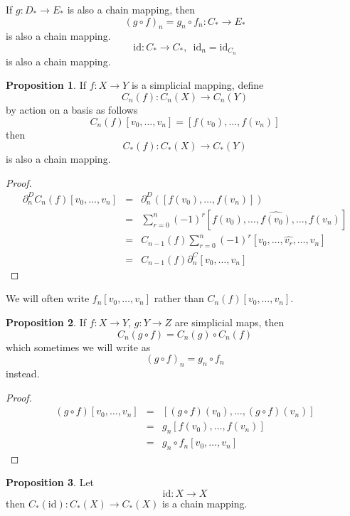 \documentclass[a4paper,14pt]{extarticle}
\theoremstyle{definition}
\newtheorem*{proposition}{Proposition}
\begin{document}
\noindent If $g:D_*\rightarrow E_*$ is also a chain mapping, then \[(g\circ f)_n=g_n\circ f_n:C_*\rightarrow E_*\] is also a chain mapping. \[\text{id}:C_*\rightarrow C_*,
\,\,\,\text{id}_n=\text{id}_{C_n}\] is also a chain mapping. \\

\begin{proposition}
If $f:X\rightarrow Y$ is a simplicial mapping, define \[C_n(f):C_n(X)\rightarrow C_n(Y)\] by action on a basis as follows
\[C_n(f)[v_0,\ldots,v_n]=[f(v_0),\ldots,f(v_n)]\] then \[C_*(f):C_*(X)\rightarrow C_*(Y)\] is also a chain mapping.
\end{proposition}

\begin{proof}
\begin{eqnarray*}
	\partial_n^DC_n(f)[v_0,\ldots,v_n]&=&\partial_n^D([f(v_0),\ldots,f(v_n)]) \\
		&=&\sum_{r=0}^n (-1)^r[f(v_0),\ldots,\hat{f(v_0)},\ldots,f(v_n)] \\
		&=&C_{n-1}(f)\sum_{r=0}^n (-1)^r[v_0,\ldots,\hat{v_r},\ldots,v_n] \\
		&=&C_{n-1}(f)\partial_n^C[v_0,\ldots,v_n]
\end{eqnarray*}
\end{proof}

We will often write $f_n[v_0,\ldots,v_n]$ rather than $C_n(f)[v_0,\ldots,v_n]$. \\

\begin{proposition}
If $f:X\rightarrow Y,\,g:Y\rightarrow Z$ are simplicial maps, then
\[C_n(g\circ f)=C_n(g)\circ C_n(f)\]
which sometimes we will write as \[(g\circ f)_n=g_n\circ f_n\] instead.
\end{proposition}

\begin{proof}
\begin{eqnarray*}
	(g\circ f)[v_0,\ldots,v_n]&=&[(g\circ f)(v_0),\ldots,(g\circ f)(v_n)] \\
				&=&g_n[f(v_0),\ldots,f(v_n)] \\
				&=&g_n\circ f_n[v_0,\ldots,v_n]
\end{eqnarray*}
\end{proof}

\begin{proposition}
Let \[\text{id}:X\rightarrow X\] then $C_*(\text{id}):C_*(X)\rightarrow C_*(X)$ is a chain mapping.
\end{proposition}
\end{document}
